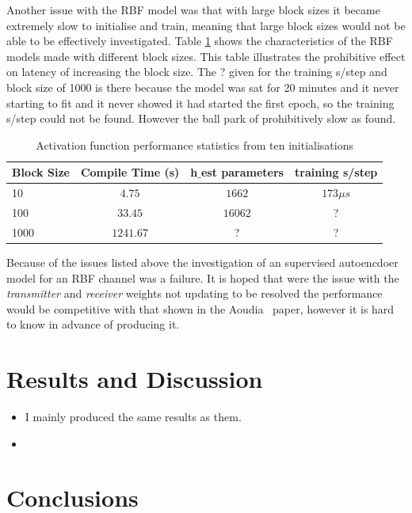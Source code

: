 \documentclass[12pt,onecolumn,letterpaper]{article}
\newcommand{\code}{\textit}
\begin{document}
Another issue with the RBF model was that with large block sizes it became extremely slow to initialise and train, meaning that large block sizes would not be able to be effectively investigated. Table \ref{tab:RbfBlockSizeChars} shows the characteristics of the RBF models made with different block sizes. This table illustrates the prohibitive effect on latency of increasing the block size. The ? given for the training s/step and block size of 1000 is there because the model was sat for 20 minutes and it never starting to fit and it never showed it had started the first epoch, so the training s/step could not be found. However the ball park of prohibitively slow as found.

\begin{table}[H]
   \begin{center}
   \begin{tabular}{|l|c|c|c|}
   \hline
   Block Size & Compile Time (s) & h$\_$est parameters & training s/step\\
   \hline\hline
   10 & $4.75$ & $1662$ & $173\mu s$ \\
   100 & $33.45$ & $16062$ & ? \\
   1000 & $1241.67$ & ? & ? \\
   \hline
   \end{tabular}
   \end{center}
   \caption{Activation function performance statistics from ten initialisations}
   \label{tab:RbfBlockSizeChars}
\end{table}

Because of the issues listed above the investigation of an supervised autoencdoer model for an RBF channel was a failure. It is hoped that were the issue with the \code{transmitter} and \code{receiver} weights not updating to be resolved the performance would be competitive with that shown in the Aoudia~\cite{Aoudia} paper, however it is hard to know in advance of producing it. 

\FloatBarrier
\section{Results and Discussion}

\begin{itemize}
   \item I mainly produced the same results as them.
   \item 
\end{itemize}


\FloatBarrier
\section{Conclusions}
\end{document}
